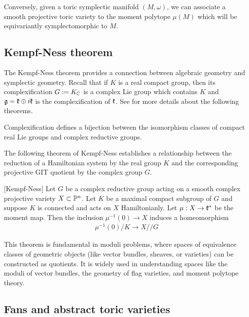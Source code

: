 Conversely, given a toric symplectic manifold $(M,\omega)$, we can associate a 
smooth projective toric variety to the moment polytope $\mu(M)$ which will be
equivariantly symplectomorphic to $M$.
\subsection{Kempf-Ness theorem}
The Kempf-Ness theorem provides a connection between algebraic geometry and symplectic geometry. 
Recall that if $K$ is a real compact group, then its complexification $G := K_\C$ is a 
complex Lie group which contains $K$ and $\mf g = \mf k \oplus i\mf k$ is the complexification of $\mf k$. See \cite{hoskins} for more details about the following theorems.

\begin{theorem}
    Complexification defines a bijection between the isomorphism
    classes of compact real Lie groups and complex reductive groups.
\end{theorem}
The following theorem of Kempf-Ness establishes a relationship between the reduction of a Hamiltonian system by the real group $K$ and the corresponding projective GIT quotient by the complex group $G$.
\begin{theorem}{\label{thm:kempf-ness}}
    [Kempf-Ness] 
    Let $G$ be a complex reductive group acting on a smooth complex projective variety 
    $X\subset \P^n$. Let $K$ be a maximal compact subgroup of $G$ and suppose $K$ 
    is connected and acts on $X$ Hamiltonianly. Let $\mu:X\to\mf k^*$ be the moment map. 
    Then the inclusion $\mu^{-1}(0)\to X$ induces a homeomorphism \begin{align*}
        \mu^{-1}(0)/K \to X//G
    \end{align*}
\end{theorem}

\begin{remark}
This theorem is fundamental in moduli problems, where spaces of equivalence classes of geometric objects (like vector bundles, sheaves, or varieties) can be constructed as quotients.
It is widely used in understanding spaces like the moduli of vector bundles, the geometry of flag varieties, and moment polytope theory.
\end{remark}

\subsection{Fans and abstract toric varieties}

